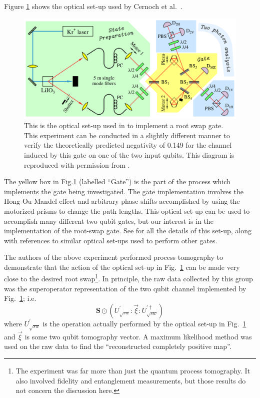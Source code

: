 Figure \ref{fig:opticalneg} shows the optical set-up used by Cernoch et al.\ \cite{Cernoch2008}.  
\begin{figure}[h!t]
\centering
\includegraphics[scale=1.5]{opticalneg1.png}
\caption{This is the optical set-up used in \cite{Cernoch2008} to implement a root swap gate.  This experiment can be conducted in a slightly different manner to verify the theoretically predicted negativity of 0.149 for the channel induced by this gate on one of the two input qubits.  This diagram is reproduced with permission from \cite{Cernoch2008}.}
\label{fig:opticalneg}
\end{figure}
The yellow box in Fig.\ref{fig:opticalneg} (labelled ``Gate'') is the part of the process which implements the gate being investigated.  The gate implementation involves the Hong-Ou-Mandel effect and arbitrary phase shifts accomplished by using the motorized prisms to change the path lengths.  This optical set-up can be used to accomplish many different two qubit gates, but our interest is in the implementation of the root-swap gate.  See \cite{Cernoch2008} for all the details of this set-up, along with references to similar optical set-ups used to perform other gates.   

The authors of the above experiment performed process tomography to demonstrate that the action of the optical set-up in Fig.\ \ref{fig:opticalneg} can be made very close to the desired root swap\footnote{The experiment was far more than just the quantum process tomography.  It also involved fidelity and entanglement measurements, but those results do not concern the discussion here.}.  In principle, the raw data collected by this group was the superoperator representation of the two qubit channel implemented by Fig.\ \ref{fig:opticalneg}; i.e.\
$$
\mathbf{S} \odot \left( U_{\sqrt{sw}}^\prime: \vec{\xi} :U_{\sqrt{sw}}^{\prime\dagger}\right)
$$
where $U_{\sqrt{sw}}^\prime$ is the operation actually performed by the optical set-up in Fig.\ \ref{fig:opticalneg} and $\vec{\xi}$ is some two qubit tomography vector.  A maximum likelihood method was used on the raw data to find the ``reconstructed completely positive map''.


